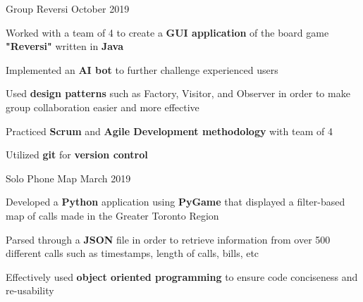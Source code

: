 \begin{cventries}
    \cventry
    {Group} %
    {Reversi} %
    {} %
    {October 2019} %
    {
      \begin{cvitems} %
      	\item {Worked with a team of 4 to create a \textbf{GUI application} of the board game \textbf{"Reversi"} written in\textbf{ Java}}
        \item {Implemented an \textbf{AI bot} to further challenge experienced users} 
        \item {Used \textbf{design patterns} such as Factory, Visitor, and Observer in order to make group collaboration easier and more effective} 
		\item {Practiced \textbf{Scrum} and \textbf{Agile Development methodology} with team of 4}
        \item {Utilized \textbf{git} for \textbf{version control}}
      \end{cvitems}
    }
    \cventry
    {Solo} %
    {Phone Map} %
    {} %
    {March 2019} %
    {
      \begin{cvitems} %
      	\item {Developed a \textbf{Python} application using \textbf{PyGame} that displayed a filter-based map of calls made in the Greater Toronto Region}
		\item {Parsed through a \textbf{JSON} file in order to retrieve information from over 500 different calls such as timestamps, length of calls, bills, etc}
        \item {Effectively used \textbf{object oriented programming} to ensure code conciseness and re-usability}
      \end{cvitems}
    }
\end{cventries}
